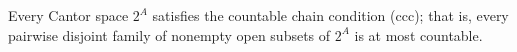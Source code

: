Every Cantor space $2^A$ satisfies the countable chain condition (ccc); that is, every pairwise disjoint family of nonempty open subsets of $2^A$ is at most countable.
